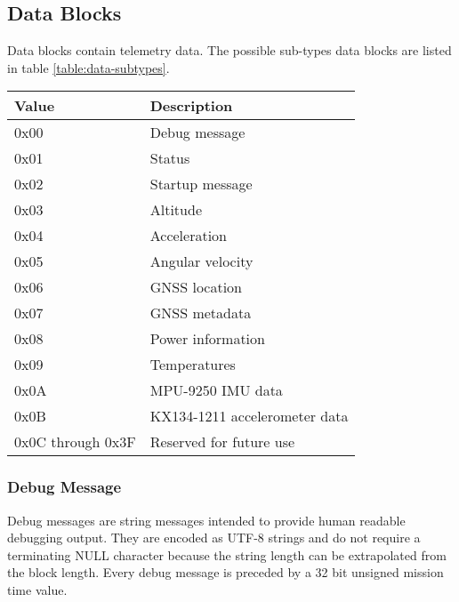 \subsection{Data Blocks}

Data blocks contain telemetry data. The possible sub-types data blocks are listed in table \ref{table:data-subtypes}.

\begin{table*}[htb]
    \centering
    \begin{tabular}{@{}ll@{}}
        \toprule
        Value             & Description                   \\
        \midrule
        0x00              & Debug message                 \\
        0x01              & Status                        \\
        0x02              & Startup message               \\
        0x03              & Altitude                      \\
        0x04              & Acceleration                  \\
        0x05              & Angular velocity              \\
        0x06              & GNSS location                 \\
        0x07              & GNSS metadata                 \\
        0x08              & Power information             \\
        0x09              & Temperatures                  \\
        0x0A              & MPU-9250 IMU data             \\
        0x0B              & KX134-1211 accelerometer data \\
        0x0C through 0x3F & Reserved for future use       \\
        \bottomrule
    \end{tabular}
    \caption{Data Block Subtypes}
    \label{table:data-subtypes}
\end{table*}

\subsubsection{Debug Message}

Debug messages are string messages intended to provide human readable debugging output. They are encoded as UTF-8
strings and do not require a terminating NULL character because the string length can be extrapolated from the block
length. Every debug message is preceded by a 32 bit unsigned mission time value.

